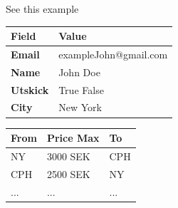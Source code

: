 See this example 

\begin{longtable}{|p{3cm}|p{9cm}|}
    \hline
    \rowcolor{headergray}
    \textbf{Field} & \textbf{Value} \\ \hline
    \textbf{Email} & exampleJohn@gmail.com \\ \hline
    \textbf{Name} & John Doe \\ \hline
    \textbf{Utskick} & True \hspace{1em} False \\ \hline
    \textbf{City} & New York \\ \hline
\end{longtable}

\vspace{1cm} %

\begin{longtable}{|p{3cm}|p{3cm}|p{3cm}|}
    \hline
    \rowcolor{headergray}
    \textbf{From} & \textbf{Price Max} & \textbf{To} \\ \hline
    NY & 3000 SEK & CPH \\ \hline
    CPH & 2500 SEK & NY \\ \hline
    ... & ... & ... \\ \hline
\end{longtable}